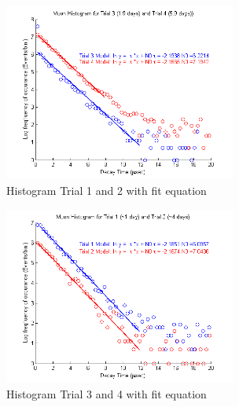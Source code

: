 \documentclass[12pt,twocolumn]{article}
\begin{document}
\begin{figure}[h!]
	\centering
	\label{fig:fit1}
	\includegraphics[width=3in]{images/hist1}
	\caption{Histogram Trial 1 and 2 with fit equation}
\end{figure}
\begin{figure}[h!]
	\centering
	\label{fig:fit1}
	\includegraphics[width=3in]{images/hist2}
	\caption{Histogram Trial 3 and 4 with fit equation}
\end{figure}

\nocite{*}


\end{document}
